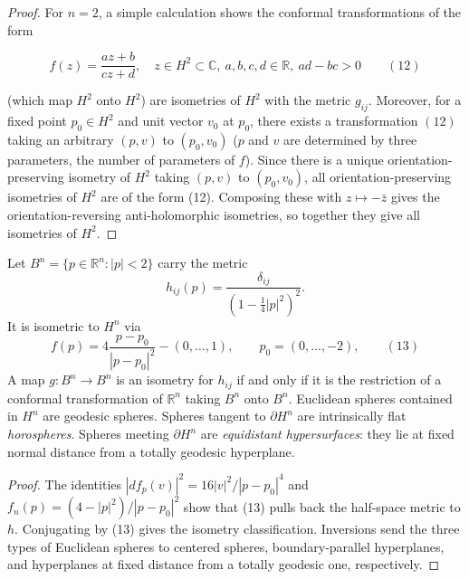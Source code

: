 \begin{proof}
  For $n=2$, a simple calculation shows the conformal transformations of the form


  $$
  f(z)=\frac{az+b}{cz+d},\quad z\in H^2\subset\mathbb{C},\ a,b,c,d\in\mathbb{R},\ ad-bc>0\qquad(12)
  $$


  (which map $H^2$ onto $H^2$) are isometries of $H^2$ with the metric $g_{ij}$.
  Moreover, for a fixed point $p_0\in H^2$ and unit vector $v_0$ at $p_0$, there
  exists a transformation $(12)$ taking an arbitrary $(p,v)$ to $(p_0,v_0)$ ($p$ and
  $v$ are determined by three parameters, the number of parameters of $f$). Since
  there is a unique orientation-preserving isometry of $H^2$ taking $(p,v)$ to
  $(p_0,v_0)$, all orientation-preserving isometries of $H^2$ are of the form (12).
  Composing these with $z\mapsto-\bar z$ gives the orientation-reversing
  anti-holomorphic isometries, so together they give all isometries of $H^2$.

\end{proof}

\begin{remark}
  \label{rem:dc-ch8-5-4}


  Let $B^n=\{p\in\mathbb R^n:|p|<2\}$ carry the metric
  $$
  h_{ij}(p)=\frac{\delta_{ij}}{(1-\tfrac14|p|^2)^2}.
  $$
  It is isometric to $H^n$ via
  $$
  f(p)=4\frac{p-p_0}{|p-p_0|^2}-(0,\dots,1),\qquad p_0=(0,\dots,-2),\qquad(13)
  $$
  A map $g:B^n\to B^n$ is an isometry for $h_{ij}$ if and only if it is the
  restriction of a conformal transformation of $\mathbb{R}^n$ taking $B^n$ onto
  $B^n$.
  Euclidean spheres contained in $H^n$ are geodesic spheres. Spheres tangent to
  $\partial H^n$ are intrinsically flat \emph{horospheres}. Spheres meeting
  $\partial H^n$ are \emph{equidistant hypersurfaces}: they lie at fixed normal
  distance from a totally geodesic hyperplane.
\end{remark}
\begin{proof}
  \sketch
  The identities
  $|df_p(v)|^2=16|v|^2/|p-p_0|^4$ and
  $f_n(p)=(4-|p|^2)/|p-p_0|^2$ show that (13) pulls back the half-space metric to
  $h$. Conjugating by (13) gives the isometry classification. Inversions send
  the three types of Euclidean spheres to centered spheres, boundary-parallel
  hyperplanes, and hyperplanes at fixed distance from a totally geodesic one,
  respectively.
\end{proof}

